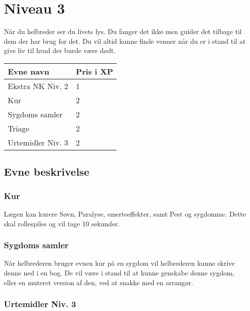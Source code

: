 \chapter*{Niveau 3}
Når du helbreder ser du livets lys. Du fanger det ikke men guider det tilbage til dem der har brug for det. Du vil altid kunne finde venner når du er i stand til at give liv til hvad der burde være dødt. 
\begin{table}[H]
    \centering
    \begin{tabular}{|p{}|p{}|}
    \rowcolor{cerulean!80}\hline
        Evne navn & Pris i XP \\\hline
        Ekstra NK Niv. 2 & 1\\\hline
        Kur & 2\\\hline
        Sygdoms samler & 2 \\\hline
        Triage & 2\\\hline
        Urtemidler Niv. 3 & 2 \\\hline
    \end{tabular}
\end{table}
\section*{Evne beskrivelse}



\subsection*{Kur}
Lægen kan kurere Søvn, Paralyse, smerteeffekter, samt Pest og
sygdomme. Dette skal rollespiles og vil tage 10 sekunder.

\subsection*{Sygdoms samler}
Når helbrederen bruger evnen kur på en sygdom vil helbrederen kunne skrive denne ned i en bog. De vil være i stand til at kunne genskabe denne sygdom, eller en muteret version af den, ved at snakke med en arrangør.



\subsection*{Urtemidler Niv. 3}

